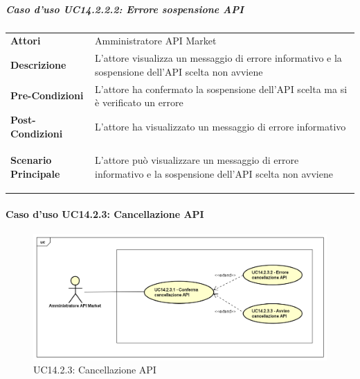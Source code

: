 \subparagraph{Caso d'uso UC14.2.2.2: Errore sospensione API}
\label{UC14_2_2_2}

\begin{minipage}{\linewidth}
	\begin{tabular}{ l | p{11cm}}
		\hline
		\rowcolor{Gray}
		\multicolumn{2}{c}{UC14.2.2.2 - Errore sospensione API} \\
		\hline
		\textbf{Attori} & Amministratore API Market \\
		\textbf{Descrizione} & L'attore visualizza un messaggio di errore informativo e la sospensione dell'API scelta non avviene \\
		\textbf{Pre-Condizioni} & L'attore ha confermato la sospensione dell'API scelta ma si è verificato un errore \\
		\textbf{Post-Condizioni} & L'attore ha visualizzato un messaggio di errore informativo \\
		\textbf{Scenario Principale} & 
		\begin{enumerate*}[label=(\arabic*.),itemjoin={\newline}]
			\item L'attore può visualizzare un messaggio di errore informativo e la sospensione dell'API scelta non avviene
		\end{enumerate*}\\
	\end{tabular}
\end{minipage}

\newpage
\paragraph{Caso d'uso UC14.2.3: Cancellazione API}
\label{UC14_2_3}
\begin{figure}[ht]
	\centering
	\includegraphics[scale=0.45]{UML/UC14_2_3.png}
	\caption{UC14.2.3: Cancellazione API}
\end{figure}

